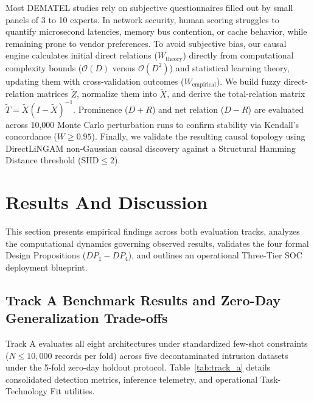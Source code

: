 \documentclass[10pt,a4paper]{article}
\begin{document}
Most DEMATEL studies rely on subjective questionnaires filled out by small panels of 3 to 10 experts. In network security, human scoring struggles to quantify microsecond latencies, memory bus contention, or cache behavior, while remaining prone to vendor preferences. To avoid subjective bias, our causal engine calculates initial direct relations ($W_{\text{theory}}$) directly from computational complexity bounds ($\mathcal{O}(D)$ versus $\mathcal{O}(D^2)$) and statistical learning theory, updating them with cross-validation outcomes ($W_{\text{empirical}}$). We build fuzzy direct-relation matrices $\tilde{Z}$, normalize them into $\tilde{X}$, and derive the total-relation matrix $\tilde{T} = \tilde{X}(I - \tilde{X})^{-1}$. Prominence ($D + R$) and net relation ($D - R$) are evaluated across 10,000 Monte Carlo perturbation runs to confirm stability via Kendall's concordance ($W \ge 0.95$). Finally, we validate the resulting causal topology using DirectLiNGAM non-Gaussian causal discovery \cite{shimizu2006linear} against a Structural Hamming Distance threshold ($\text{SHD} \le 2$).

\section{Results And Discussion}
This section presents empirical findings across both evaluation tracks, analyzes the computational dynamics governing observed results, validates the four formal Design Propositions ($DP_1 - DP_4$), and outlines an operational Three-Tier SOC deployment blueprint.

\subsection{Track A Benchmark Results and Zero-Day Generalization Trade-offs}
Track A evaluates all eight architectures under standardized few-shot constraints ($N \le 10,000$ records per fold) across five decontaminated intrusion datasets under the 5-fold zero-day holdout protocol. Table~\ref{tab:track_a} details consolidated detection metrics, inference telemetry, and operational Task-Technology Fit utilities.
\end{document}
